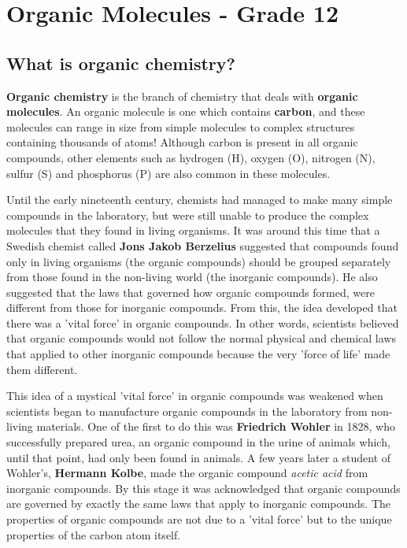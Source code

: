 \chapter{Organic Molecules - Grade 12}
\label{chap:om}




\section{What is organic chemistry?}
\label{sec:om:hist}

\textbf{Organic chemistry} is the branch of chemistry that deals with \textbf{organic molecules}. An organic molecule is one which contains \textbf{carbon}, and these molecules can range in size from simple molecules to complex structures containing thousands of atoms! Although carbon is present in all organic compounds, other elements such as hydrogen (H), oxygen (O), nitrogen (N), sulfur (S) and phosphorus (P) are also common in these molecules.

Until the early nineteenth century, chemists had managed to make many simple compounds in the laboratory, but were still unable to produce the complex molecules that they found in living organisms. It was around this time that a Swedish chemist called \textbf{Jons Jakob Berzelius} suggested that compounds found only in living organisms (the organic compounds) should be grouped separately from those found in the non-living world (the inorganic compounds). He also suggested that the laws that governed how organic compounds formed, were different from those for inorganic compounds. From this, the idea developed that there was a 'vital force' in organic compounds. In other words, scientists believed that organic compounds would not follow the normal physical and chemical laws that applied to other inorganic compounds because the very 'force of life' made them different.

This idea of a mystical 'vital force' in organic compounds was weakened when scientists began to manufacture organic compounds in the laboratory from non-living materials. One of the first to do this was \textbf{Friedrich Wohler} in 1828, who successfully prepared urea, an organic compound in the urine of animals which, until that point, had only been found in animals. A few years later a student of Wohler's, \textbf{Hermann Kolbe}, made the organic compound \textit{acetic acid} from inorganic compounds. By this stage it was acknowledged that organic compounds are governed by exactly the same laws that apply to inorganic compounds. The properties of organic compounds are not due to a 'vital force' but to the unique properties of the carbon atom itself.\\

